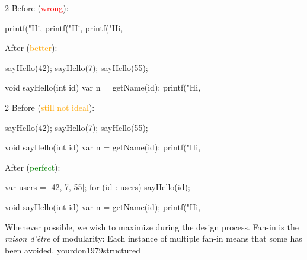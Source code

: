 \documentclass{article}
\begin{document}



\begin{multicols}{2}
Before (\textcolor{red}{wrong}):\par
{\small\begin{ffcode}
printf("Hi, %
printf("Hi, %
printf("Hi, %
\end{ffcode}
}
\par\columnbreak\par
After (\textcolor{orange}{better}):\par
{\small\begin{ffcode}
sayHello(42);
sayHello(7);
sayHello(55);

void sayHello(int id) {
  var n = getName(id);
  printf("Hi, %
}
\end{ffcode}
}
\end{multicols}
\plush{}

\begin{multicols}{2}
Before (\textcolor{orange}{still not ideal}):\par
{\small\begin{ffcode}
sayHello(42);
sayHello(7);
sayHello(55);

void sayHello(int id) {
  var n = getName(id);
  printf("Hi, %
}
\end{ffcode}
}
\par\columnbreak\par
After (\textcolor{green}{perfect}):\par
{\small\begin{ffcode}
var users = [42, 7, 55];
for (id : users) {
  sayHello(id);
}

void sayHello(int id) {
  var n = getName(id);
  printf("Hi, %
}
\end{ffcode}
}
\end{multicols}
\plush{}


  {Whenever possible, we wish to maximize  during the design process. Fan-in is the \textit{raison d'\^{e}tre} of modularity: Each instance of multiple fan-in means that some  has been avoided.}
  {yourdon1979structured}
\end{document}
